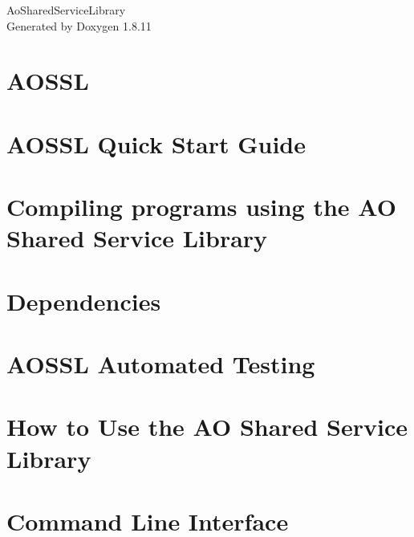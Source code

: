 \documentclass[twoside]{book}
\newcommand{\+}{\discretionary{\mbox{\scriptsize$\hookleftarrow$}}{}{}}
\newcommand{\clearemptydoublepage}{%
  \newpage{\pagestyle{empty}\cleardoublepage}%
}
\begin{document}
\hypersetup{pageanchor=false,
             bookmarksnumbered=true,
             pdfencoding=unicode
            }
\begin{titlepage}
\vspace*{7cm}
\begin{center}%
{\Large Ao\+Shared\+Service\+Library }\\
\vspace*{1cm}
{\large Generated by Doxygen 1.8.11}\\
\end{center}
\end{titlepage}
\clearemptydoublepage
\tableofcontents
\clearemptydoublepage
{}
\hypersetup{pageanchor=true}

\chapter{A\+O\+S\+SL}
\label{index}\hypertarget{index}{}
\chapter{A\+O\+S\+SL Quick Start Guide}
\label{quickstart}
\hypertarget{quickstart}{}

\chapter{Compiling programs using the AO Shared Service Library}
\label{compilation}
\hypertarget{compilation}{}

\chapter{Dependencies}
\label{dependencies}
\hypertarget{dependencies}{}

\chapter{A\+O\+S\+SL Automated Testing}
\label{tests}
\hypertarget{tests}{}

\chapter{How to Use the AO Shared Service Library}
\label{use_index}
\hypertarget{use_index}{}

\chapter{Command Line Interface}
\label{cli}
\hypertarget{cli}{}

\end{document}
